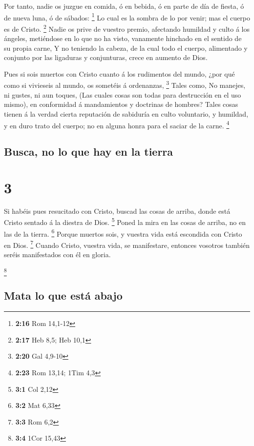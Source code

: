  Por tanto, nadie os juzgue en comida, ó en bebida, ó en
parte de día de fiesta, ó de nueva luna, ó de sábados: \footnote{\textbf{2:16}
  Rom 14,1-12}  Lo cual es la sombra de lo por venir; mas
el cuerpo es de Cristo. \footnote{\textbf{2:17} Heb 8,5; Heb 10,1}
 Nadie os prive de vuestro premio, afectando humildad y
culto á los ángeles, metiéndose en lo que no ha visto, vanamente
hinchado en el sentido de su propia carne,  Y no teniendo
la cabeza, de la cual todo el cuerpo, alimentado y conjunto por las
ligaduras y conjunturas, crece en aumento de Dios.

 Pues si sois muertos con Cristo cuanto á los rudimentos
del mundo, ¿por qué como si vivieseis al mundo, os sometéis á
ordenanzas, \footnote{\textbf{2:20} Gal 4,9-10}  Tales
como, No manejes, ni gustes, ni aun toques,  (Las cuales
cosas son todas para destrucción en el uso mismo), en conformidad á
mandamientos y doctrinas de hombres?  Tales cosas tienen á
la verdad cierta reputación de sabiduría en culto voluntario, y
humildad, y en duro trato del cuerpo; no en alguna honra para el saciar
de la carne. \footnote{\textbf{2:23} Rom 13,14; 1Tim 4,3}

\hypertarget{busca-no-lo-que-hay-en-la-tierra}{%
\subsection{Busca, no lo que hay en la
tierra}\label{busca-no-lo-que-hay-en-la-tierra}}

\hypertarget{section-2}{%
\section{3}\label{section-2}}

 Si habéis pues resucitado con Cristo, buscad las cosas de
arriba, donde está Cristo sentado á la diestra de Dios. \footnote{\textbf{3:1}
  Col 2,12}  Poned la mira en las cosas de arriba, no en las
de la tierra. \footnote{\textbf{3:2} Mat 6,33}  Porque
muertos sois, y vuestra vida está escondida con Cristo en Dios.
\footnote{\textbf{3:3} Rom 6,2}  Cuando Cristo, vuestra
vida, se manifestare, entonces vosotros también seréis manifestados con
él en gloria.

\footnote{\textbf{3:4} 1Cor 15,43}

\hypertarget{mata-lo-que-estuxe1-abajo}{%
\subsection{Mata lo que está abajo}\label{mata-lo-que-estuxe1-abajo}}


